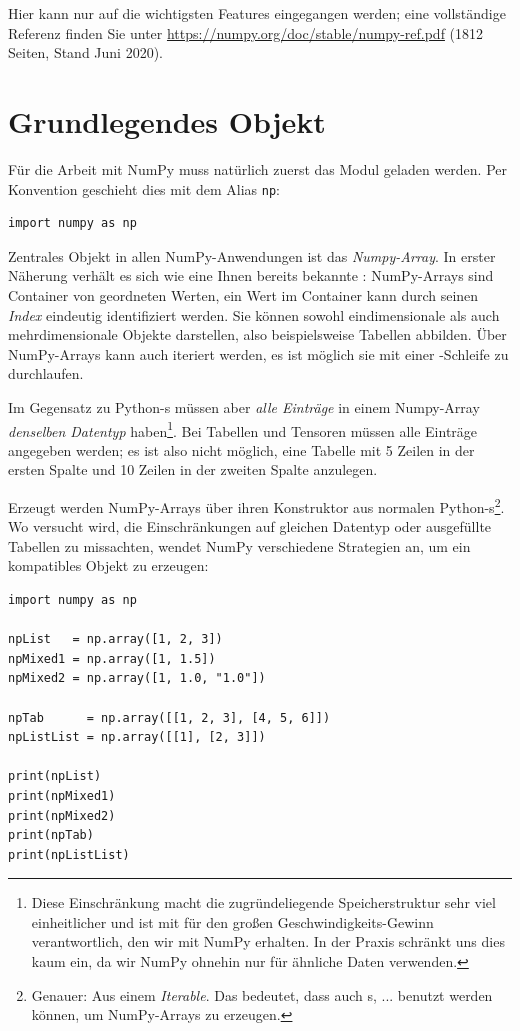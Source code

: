 Hier kann nur auf die wichtigsten Features eingegangen werden; eine vollständige Referenz finden Sie unter \url{https://numpy.org/doc/stable/numpy-ref.pdf} (1812 Seiten, Stand Juni 2020).

\section{Grundlegendes Objekt}
Für die Arbeit mit NumPy muss natürlich zuerst das Modul geladen werden. Per Konvention geschieht dies mit dem Alias \texttt{np}:
\begin{codebox}
\begin{verbatim}
import numpy as np
\end{verbatim}
\end{codebox}

Zentrales Objekt in allen NumPy-Anwendungen ist das \emph{Numpy-Array}. In erster Näherung verhält es sich wie eine Ihnen bereits bekannte : NumPy-Arrays sind Container von geordneten Werten, \ie ein Wert im Container kann durch seinen \emph{Index} eindeutig identifiziert werden. Sie können sowohl eindimensionale als auch mehrdimensionale Objekte darstellen, also beispielsweise Tabellen abbilden. Über NumPy-Arrays kann auch iteriert werden, \ie es ist möglich sie mit einer -Schleife zu durchlaufen.

Im Gegensatz zu Python-s müssen aber \emph{alle Einträge} in einem Numpy-Array \emph{denselben Datentyp} haben\footnote{Diese Einschränkung macht die zugründeliegende Speicherstruktur sehr viel einheitlicher und ist mit für den großen Geschwindigkeits-Gewinn verantwortlich, den wir mit NumPy erhalten. In der Praxis schränkt uns dies kaum ein, da wir NumPy ohnehin nur für ähnliche Daten verwenden.}. Bei Tabellen und Tensoren müssen alle Einträge angegeben werden; es ist also nicht möglich, eine Tabelle mit 5 Zeilen in der ersten Spalte und 10 Zeilen in der zweiten Spalte anzulegen.

Erzeugt werden NumPy-Arrays über ihren Konstruktor aus normalen Python-s\footnote{Genauer: Aus einem \emph{Iterable}. Das bedeutet, dass auch s, ... benutzt werden können, um NumPy-Arrays zu erzeugen.}. Wo versucht wird, die Einschränkungen auf gleichen Datentyp oder ausgefüllte Tabellen zu missachten, wendet NumPy verschiedene Strategien an, um ein kompatibles Objekt zu erzeugen:

\begin{codebox}
\begin{verbatim}
import numpy as np

npList   = np.array([1, 2, 3])
npMixed1 = np.array([1, 1.5])
npMixed2 = np.array([1, 1.0, "1.0"])

npTab      = np.array([[1, 2, 3], [4, 5, 6]])
npListList = np.array([[1], [2, 3]])

print(npList)
print(npMixed1)
print(npMixed2)
print(npTab)
print(npListList)
\end{verbatim}
\end{codebox}

